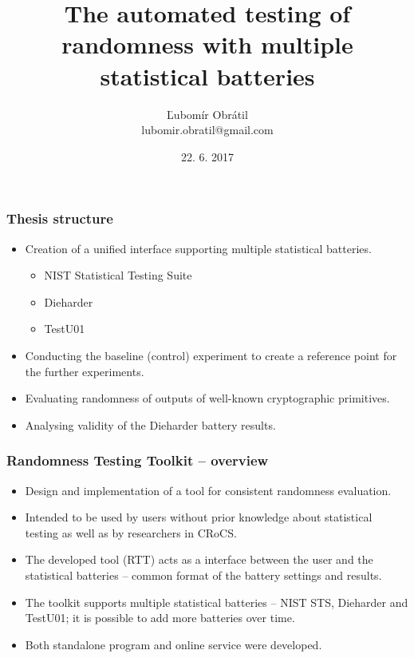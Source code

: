 \documentclass[aspectratio=169]{beamer}
\title[Randomness Testing Toolkit]{The automated testing of randomness with multiple statistical batteries} %
\author[lubomir.obratil@gmail.com]{Ľubomír Obrátil\\lubomir.obratil@gmail.com} %
\date{22. 6. 2017} %
\begin{document}
\begin{frame}
\titlepage %
\end{frame}


\begin{frame}
\frametitle{Thesis structure}

\begin{itemize}
\item Creation of a unified interface supporting multiple statistical batteries.
\begin{itemize}
\item NIST Statistical Testing Suite
\item Dieharder
\item TestU01
\end{itemize}
\item Conducting the baseline (control) experiment to create a reference point for the further experiments.
\item Evaluating randomness of outputs of well-known cryptographic primitives.
\item Analysing validity of the Dieharder battery results.
\end{itemize}

\end{frame}

\begin{frame}
\frametitle{Randomness Testing Toolkit -- overview}
\begin{itemize}
\item Design and implementation of a tool for consistent randomness evaluation.
\item Intended to be used by users without prior knowledge about statistical testing as well as by researchers in CRoCS. 
\item The developed tool (RTT) acts as a interface between the user and the statistical batteries -- common format of the battery settings and results.
\item The toolkit supports multiple statistical batteries -- NIST STS, Dieharder and TestU01; it is possible to add more batteries over time.
\item Both standalone program and online service were developed.
\end{itemize}
\end{frame}
\end{document}
